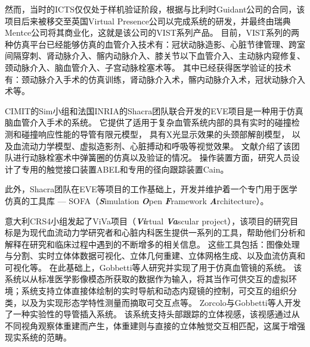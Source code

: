 然而，当时的ICTS仅仅处于样机验证阶段，根据与比利时Guidant公司的合同，该项目后来被移交至英国Virtual Presence公司以完成系统的研发，并最终由瑞典Mentce公司\cite{menticeweb}将其商业化\cite{GuidantMenticeNewsWeb}\cite{coles2011surveyCRaIVE}，这就是该公司的VIST系列产品。
目前，VIST系列的两种仿真平台已经能够仿真的血管介入技术有：冠状动脉造影、心脏节律管理、跨室间隔穿刺、肾动脉介入、髂内动脉介入、膝关节以下血管介入、主动脉内窥修复、颈动脉介入、脑血管介入、子宫动脉栓塞术等\cite{menticeweb}。
其中已经获得医学验证的技术有：颈动脉介入手术的仿真训练\cite{Dayal2004VIST}\cite{Hsu2004VIST}\cite{Nicholson2006VIST}\cite{Patel2006VIST}\cite{Cates2007VIST}\cite{VanHerzeele2009VIST}，肾动脉介入术\cite{Aggarwal2006}\cite{Glaiberman2008VIST}，髂内动脉介入术\cite{Chaer2006VIST}\cite{Berry2007VIST}\cite{VanHerzeele2008VIST}，冠状动脉介入术\cite{Gallagher2006VIST}等。

CIMIT的Sim小组\cite{medicalsimweb}和法国INRIA的Shacra团队\cite{shacraweb}联合开发的EVE项目\cite{Wu2005EVE}是一种用于仿真脑血管介入手术的系统。
它提供了适用于复杂血管系统内部的具有实时的碰撞检测和碰撞响应性能的导管有限元模型\cite{dequidt2007EVE}\cite{Duriez2006EVE}\cite{Lenoir2006EVE}\cite{Lenoir2005EVE}\cite{Cotin2005EVE}，
具有X光显示效果的头颈部解剖模型\cite{Wu2011EVE}\cite{Luboz2005EVE}\cite{Muniyandi2003EVE}，
以及血流动力学模型、虚拟造影剂、心脏搏动和呼吸\cite{Wu2007EVE}等视觉效果。
文献\cite{Dequidt2008EVE}介绍了该团队进行动脉栓塞术中弹簧圈的仿真以及验证的情况。
操作装置方面，研究人员设计了专用的触觉接口装置ABEL和专用的径向跟踪装置Cain\cite{medicalsimweb}。

此外，Shacra团队在EVE等项目的工作基础上，开发并维护着一个专门用于医学仿真的工具库 --- SOFA（\textbf{\textit{S}}imulation \textbf{\textit{O}}pen \textbf{\textit{F}}ramework \textbf{\textit{A}}rchitecture）\cite{Allard2007SOFA}。

意大利CRS4小组发起了ViVa项目（\textbf{\textit{Vi}}rtual \textbf{\textit{Va}}scular project）\cite{abdoulaev1998}，该项目的研究目标是为现代血流动力学研究者和心脏内科医生提供一系列的工具，帮助他们分析和解释在研究和临床过程中遇到的不断增多的相关信息。
这些工具包括：图像处理与分割、实时立体体数据可视化、立体几何重建、立体网格生成、以及血流仿真和可视化等。
在此基础上，Gobbetti等人\cite{Gobbetti1998}研究并实现了用于仿真血管镜的系统。
该系统以从标准医学影像模态所获取的数据作为输入，将其当作可供交互的虚拟环境；系统支持立体直接体绘制的实时导航和动态内窥镜的控制，可交互的组织分类，以及为实现形态学特性测量而摘取可交互点等。
Zorcolo与Gobbetti等人\cite{Zorcolo1999}\cite{Gobbetti2000}\cite{Zorcolo2000}开发了一种实验性的导管插入系统。
该系统支持头部跟踪的立体视感，该视感通过从不同视角观察体重建而产生，体重建则与直接的立体触觉交互相匹配，这属于增强现实系统的范畴。

